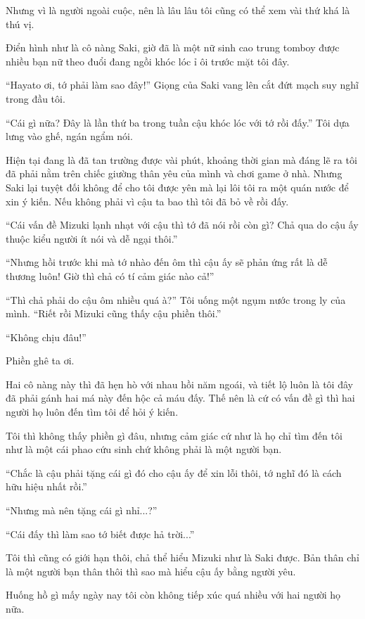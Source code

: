 {Nhưng vì là người ngoài cuộc, nên là lâu lâu tôi cũng có thể xem vài thứ
khá là thú vị.

Điển hình như là cô nàng Saki, giờ đã là một nữ sinh cao trung tomboy
được nhiều bạn nữ theo đuổi đang ngồi khóc lóc ỉ ôi trước mặt tôi đây.

``Hayato ơi, tớ phải làm sao đây!'' Giọng của Saki vang lên cắt đứt mạch
suy nghĩ trong đầu tôi.

``Cái gì nữa? Đây là lần thứ ba trong tuần cậu khóc lóc với tớ rồi
đấy.'' Tôi dựa lưng vào ghế, ngán ngẩm nói.

Hiện tại đang là đã tan trường được vài phút, khoảng thời gian mà đáng
lẽ ra tôi đã phải nằm trên chiếc giường thân yêu của mình và chơi game ở
nhà. Nhưng Saki lại tuyệt đối không để cho tôi được yên mà lại lôi tôi
ra một quán nước để xin ý kiến. Nếu không phải vì cậu ta bao thì tôi đã
bỏ về rồi đấy.

``Cái vấn đề Mizuki lạnh nhạt với cậu thì tớ đã nói rồi còn gì? Chả qua
do cậu ấy thuộc kiểu người ít nói và dễ ngại thôi.''

``Nhưng hồi trước khi mà tớ nhào đến ôm thì cậu ấy sẽ phản ứng rất là dễ
thương luôn! Giờ thì chả có tí cảm giác nào cả!''

``Thì chả phải do cậu ôm nhiều quá à?'' Tôi uống một ngụm nước trong ly
của mình. ``Riết rồi Mizuki cũng thấy cậu phiền thôi.''

``Không chịu đâu!''

Phiền ghê ta ơi.

Hai cô nàng này thì đã hẹn hò với nhau hồi năm ngoái, và tiết lộ luôn là
tôi đây đã phải gánh hai má này đến hộc cả máu đấy. Thế nên là cứ có vấn
đề gì thì hai người họ luôn đến tìm tôi để hỏi ý kiến.

Tôi thì không thấy phiền gì đâu, nhưng cảm giác cứ như là họ chỉ tìm đến
tôi như là một cái phao cứu sinh chứ không phải là một người bạn.

``Chắc là cậu phải tặng cái gì đó cho cậu ấy để xin lỗi thôi, tớ nghĩ đó
là cách hữu hiệu nhất rồi.''

``Nhưng mà nên tặng cái gì nhỉ...?''

``Cái đấy thì làm sao tớ biết được hả trời...''

Tôi thì cũng có giới hạn thôi, chả thể hiểu Mizuki như là Saki được. Bản
thân chỉ là một người bạn thân thôi thì sao mà hiểu cậu ấy bằng người
yêu.

Huống hồ gì mấy ngày nay tôi còn không tiếp xúc quá nhiều với hai người
họ nữa.

}
